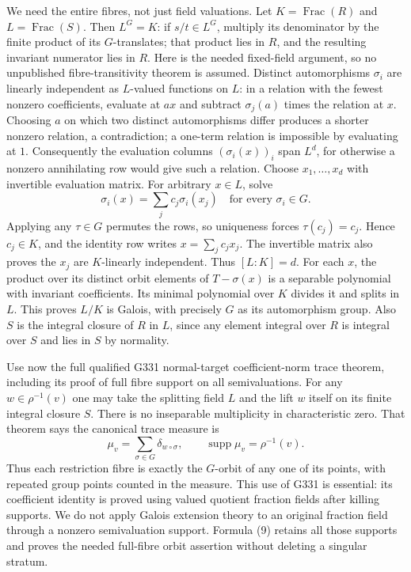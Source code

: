 \documentclass[11pt]{article}
\begin{document}
We need the entire fibres, not just field valuations. Let $K=\operatorname{Frac}(R)$ and $L=\operatorname{Frac}(S)$. Then $L^G=K$: if $s/t\in L^G$, multiply its denominator by the finite product of its $G$-translates; that product lies in $R$, and the resulting invariant numerator lies in $R$. Here is the needed fixed-field argument, so no unpublished fibre-transitivity theorem is assumed. Distinct automorphisms $\sigma_i$ are linearly independent as $L$-valued functions on $L$: in a relation with the fewest nonzero coefficients, evaluate at $ax$ and subtract $\sigma_j(a)$ times the relation at $x$. Choosing $a$ on which two distinct automorphisms differ produces a shorter nonzero relation, a contradiction; a one-term relation is impossible by evaluating at $1$. Consequently the evaluation columns $(\sigma_i(x))_i$ span $L^d$, for otherwise a nonzero annihilating row would give such a relation. Choose $x_1,\ldots,x_d$ with invertible evaluation matrix. For arbitrary $x\in L$, solve
\[
 \sigma_i(x)=\sum_j c_j\sigma_i(x_j)\quad\text{for every }\sigma_i\in G.
\]
Applying any $\tau\in G$ permutes the rows, so uniqueness forces $\tau(c_j)=c_j$. Hence $c_j\in K$, and the identity row writes $x=\sum_jc_jx_j$. The invertible matrix also proves the $x_j$ are $K$-linearly independent. Thus $[L:K]=d$. For each $x$, the product over its distinct orbit elements of $T-\sigma(x)$ is a separable polynomial with invariant coefficients. Its minimal polynomial over $K$ divides it and splits in $L$. This proves $L/K$ is Galois, with precisely $G$ as its automorphism group. Also $S$ is the integral closure of $R$ in $L$, since any element integral over $R$ is integral over $S$ and lies in $S$ by normality.

Use now the full qualified G331 normal-target coefficient-norm trace theorem, including its proof of full fibre support on all semivaluations. For any $w\in\rho^{-1}(v)$ one may take the splitting field $L$ and the lift $w$ itself on its finite integral closure $S$. There is no inseparable multiplicity in characteristic zero. That theorem says the canonical trace measure is
\[
 \mu_v=\sum_{\sigma\in G}\delta_{w\circ\sigma},\qquad
 \operatorname{supp}\mu_v=\rho^{-1}(v). \tag{9}
\]
Thus each restriction fibre is exactly the $G$-orbit of any one of its points, with repeated group points counted in the measure. This use of G331 is essential: its coefficient identity is proved using valued quotient fraction fields after killing supports. We do not apply Galois extension theory to an original fraction field through a nonzero semivaluation support. Formula (9) retains all those supports and proves the needed full-fibre orbit assertion without deleting a singular stratum.
\end{document}
